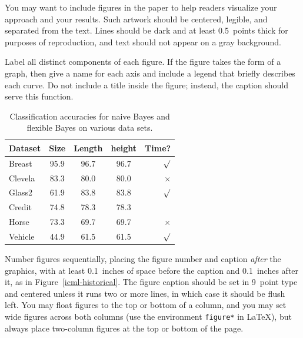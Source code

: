 \documentclass{article}
\begin{document}
You may want to include figures in the paper to help readers visualize
your approach and your results. Such artwork should be centered,
legible, and separated from the text. Lines should be dark and at
least 0.5~points thick for purposes of reproduction, and text should
not appear on a gray background.

Label all distinct components of each figure. If the figure takes the
form of a graph, then give a name for each axis and include a legend
that briefly describes each curve. Do not include a title inside the
figure; instead, the caption should serve this function.


\begin{table}[t]
\caption{Classification accuracies for naive Bayes and flexible
Bayes on various data sets.}
\label{sample-table}
\vskip 0.15in
\begin{center}
\begin{small}
\begin{sc}
\begin{tabular}{lcccr}
\hline
\abovespace\belowspace
Dataset & Size & Length & height & Time? \\
\hline
\abovespace
Breast    & 95.9& 96.7& 96.7&$\surd$  \\
Clevela & 83.3& 80.0& 80.0&$\times$ \\
Glass2    & 61.9& 83.8& 83.8&$\surd$  \\
Credit    & 74.8& 78.3& 78.3&          \\
Horse     & 73.3& 69.7& 69.7&$\times$ \\
\belowspace
Vehicle   & 44.9& 61.5& 61.5&$\surd$  \\
\hline
\end{tabular}
\end{sc}
\end{small}
\end{center}
\vskip -0.1in
\end{table}

Number figures sequentially, placing the figure number and caption
{\it after\/} the graphics, with at least 0.1~inches of space before
the caption and 0.1~inches after it, as in
Figure~\ref{icml-historical}.  The figure caption should be set in
9~point type and centered unless it runs two or more lines, in which
case it should be flush left.  You may float figures to the top or
bottom of a column, and you may set wide figures across both columns
(use the environment {\tt figure*} in \LaTeX), but always place
two-column figures at the top or bottom of the page.
\end{document}

